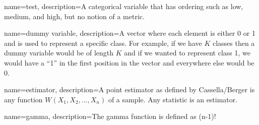 {
        name={test},
        description={A categorical variable that has ordering such as low, medium, and high, but no notion of a metric.}
}

{
        name={dummy variable},
        description={A vector where each element is either 0 or 1 and is used to represent a specific class. For example, if we have $K$ classes then a dummy variable would be of length $K$ and if we wanted to represent class 1, we would have a ``1'' in the first position in the vector and everywhere else would be 0.}
}

{
        name={estimator},
        description={A point estimator as defined by Cassella/Berger is any function $W(X_1, X_2, ..., X_n)$ of a sample. Any statistic is an estimator.}
}

{
 	name={gamma},
 	description={The gamma function is defined as (n-1)!}
 }


%
%



